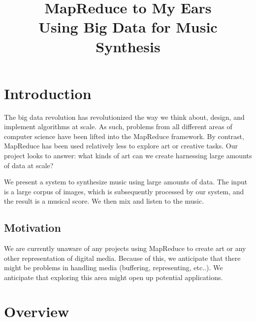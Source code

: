 \documentclass[10pt, conference, compsocconf]{IEEEtran}
\begin{document}
%

\title{MapReduce to My Ears\\
{\Large Using Big Data for Music Synthesis}
}

\author{
}

\maketitle

\begin{abstract}
\end{abstract}

\section{Introduction}
\label{sec:introduction}

The big data revolution has revolutionized the way we think about,
design, and implement algorithms at scale.  As such, problems from all
different areas of computer science have been lifted into the
MapReduce framework.  By contrast, MapReduce has been used relatively
less to explore art or creative tasks.  Our project looks to answer:
what kinds of art can we create harnessing large amounts of data at
scale?

We present a system to synthesize music using large amounts of data.
The input is a large corpus of images, which is subsequently processed
by our system, and the result is a musical score.  We then mix and
listen to the music.

\subsection{Motivation} 

We are currently unaware of any projects using MapReduce to create art
or any other representation of digital media.  Because of this, we
anticipate that there might be problems in handling media (buffering,
representing, etc..).  We anticipate that exploring this area might
open up potential applications.

\section{Overview}
\label{sec:overview}
\end{document}
